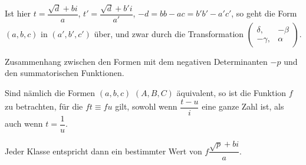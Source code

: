\begin{itshape}
Ist hier $t=\dfrac{\surd d+bi}{a}$, $t'=\dfrac{\surd d+b'i}{a'}$,
$-d=bb-ac=b'b'-a'c'$, so geht die Form $(a,\allowbreak b,\allowbreak c)$ in $(a',\allowbreak b',\allowbreak c')$ über, und zwar durch die Transformation
$\left(\begin{smallmatrix}\delta,\allowbreak &-\beta\\-\gamma,\allowbreak &\alpha\end{smallmatrix}\right)$.

Zusammenhang zwischen den Formen mit dem negativen Determinanten $-p$ und den summatorischen Funktionen.

Sind nämlich die Formen $(a,\allowbreak b,\allowbreak c)$ $(A,\allowbreak B,\allowbreak C)$ äquivalent, so ist die Funktion $f$ zu betrachten, für die $ft\equiv fu$ gilt, sowohl wenn $\dfrac{t-u}{i}$ eine ganze Zahl ist, als auch wenn
$t=\dfrac1u$.
\par
Jeder Klasse entspricht dann ein bestimmter Wert von $f\dfrac{\surd p+bi}{a}$.
\end{itshape}


